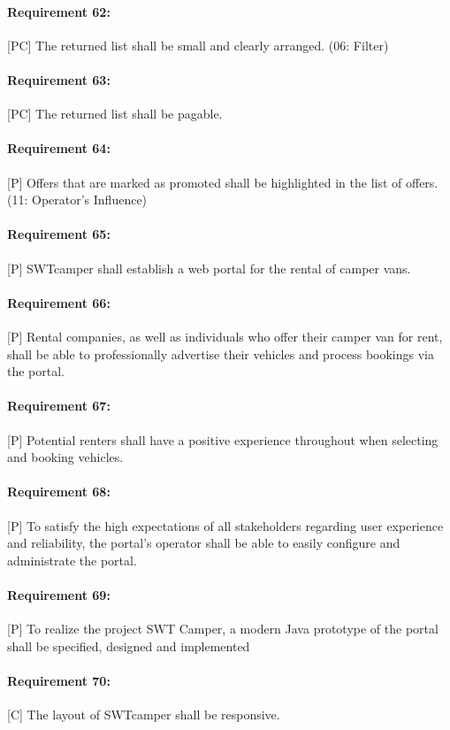 \paragraph{Requirement 62:} [PC] The returned list shall be small and clearly arranged. (06: Filter)
\paragraph{Requirement 63:} [PC] The returned list shall be pagable.
\paragraph{Requirement 64:} [P] Offers that are marked as promoted shall be highlighted in the list of offers. (11: Operator's Influence)

\paragraph{Requirement 65:} [P] SWTcamper shall establish a web portal for the rental of camper vans.
\paragraph{Requirement 66:} [P] Rental companies, as well as individuals who offer their camper van for rent, shall be able to professionally advertise their vehicles and process bookings via the portal.
\paragraph{Requirement 67:} [P] Potential renters shall have a positive experience throughout when selecting and booking vehicles.
\paragraph{Requirement 68:} [P] To satisfy the high expectations of all stakeholders regarding user experience and reliability, the portal's operator shall be able to easily configure and administrate the portal.
\paragraph{Requirement 69:} [P] To realize the project SWT Camper, a modern Java prototype of the portal shall be specified, designed and implemented
\paragraph{Requirement 70:} [C] The layout of SWTcamper shall be responsive.
